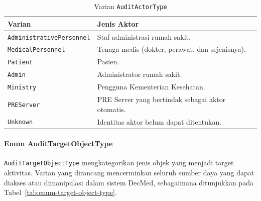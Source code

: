 \begin{table}[htbp]
\centering
\caption{Varian \texttt{AuditActorType}}
\label{tab:enum-actor-type}
\renewcommand{\arraystretch}{1.3}
\begin{tabular}{|p{4.5cm}|p{7.5cm}|}
\hline
\textbf{Varian} & \textbf{Jenis Aktor} \\
\hline
\texttt{AdministrativePersonnel} & Staf administrasi rumah sakit. \\
\hline
\texttt{MedicalPersonnel} & Tenaga medis (dokter, perawat, dan sejenisnya). \\
\hline
\texttt{Patient} & Pasien. \\
\hline
\texttt{Admin} & Administrator rumah sakit. \\
\hline
\texttt{Ministry} & Pengguna Kementerian Kesehatan. \\
\hline
\texttt{PREServer} & PRE Server yang bertindak sebagai aktor otomatis. \\
\hline
\texttt{Unknown} & Identitas aktor belum dapat ditentukan. \\
\hline
\end{tabular}
\end{table}

\paragraph{Enum AuditTargetObjectType}

\texttt{AuditTargetObjectType} mengkategorikan jenis objek yang menjadi target
aktivitas. Varian yang dirancang mencerminkan seluruh sumber daya yang dapat
diakses atau dimanipulasi dalam sistem DecMed, sebagaimana ditunjukkan pada
Tabel~\ref{tab:enum-target-object-type}.

